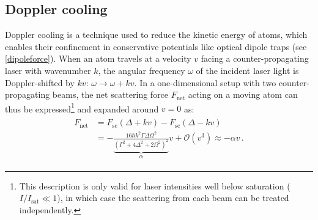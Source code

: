 \documentclass[../Thesis-IJspeert.tex]{subfiles}
\begin{document}
\subsection{Doppler cooling}
\label{dopplercooling}
Doppler cooling is a technique used to reduce the kinetic energy of atoms, which enables their confinement in conservative potentials like optical dipole traps (see \autoref{dipoleforce}). When an atom travels at a velocity $v$ facing a counter-propagating laser with wavenumber $k$, the angular frequency $\omega$ of the incident laser light is Doppler-shifted by $kv$: $\omega \rightarrow \omega + kv$. In a one-dimensional setup with two counter-propagating beams, the net scattering force $F_\mathrm{net}$ acting on a moving atom can thus be expressed\footnote{This description is only valid for laser intensities well below saturation ($I/I_\mathrm{sat}\ll 1$), in which case the scattering from each beam can be treated independently.} and expanded around $v=0$ as:
\begin{align}
\begin{split}
	F_\mathrm{net} &= F_\mathrm{sc}(\Delta+kv) - F_\mathrm{sc}(\Delta-kv) \\&= -\underbrace{\frac{16  \hbar k^2 \Gamma\Delta\Omega^2 }{(\Gamma^2 + 4 \Delta^2 +  2 \Omega^2)^2}}_{\alpha}v + \mathcal{O}(v^3) \approx -\alpha v\,.
\end{split}
\label{coolingforce}
\end{align}
\end{document}
